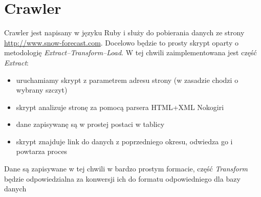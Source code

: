 \documentclass[12pt]{article}
\begin{document}
\section{Crawler}
Crawler jest napisany w języku Ruby i służy do pobierania danych ze strony \url{http://www.snow-forecast.com}.
Docelowo będzie to prosty skrypt oparty o metodologię \emph{Extract--Transform--Load}. W tej chwili zaimplementowana
jest część \emph{Extract}:
\begin{itemize}
\item uruchamiamy skrypt z parametrem adresu strony (w zasadzie chodzi o wybrany szczyt)
\item skrypt analizuje stronę za pomocą parsera HTML+XML Nokogiri
\item dane zapisywanę są w prostej postaci w tablicy
\item skrypt znajduje link do danych z poprzedniego okresu, odwiedza go i powtarza proces
\end{itemize}

Dane są zapisywane w tej chwili w bardzo prostym formacie, część \emph{Transform} będzie odpowiedzialna
za konwersji ich do formatu odpowiedniego dla bazy danych
\end{document}
